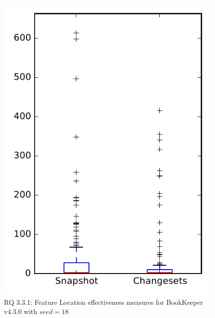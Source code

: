 
\begin{figure}
\centering
\includegraphics[height=0.4\textheight]{figures/flt_seed/rq1_bookkeeper_18}
\caption{RQ 3.3.1: Feature Location effectiveness measures for BookKeeper v4.3.0 with $seed=18$}
\label{fig:flt_seed:rq1:bookkeeper}
\end{figure}
